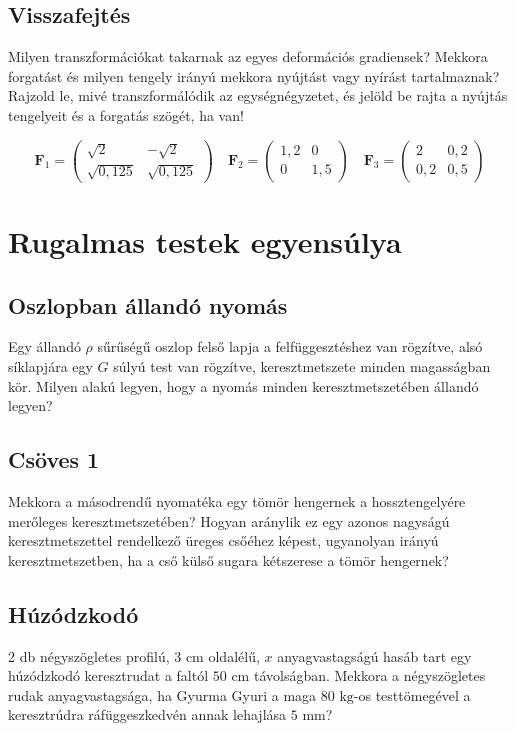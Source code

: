 \documentclass[12pt,a4paper]{scrartcl}
\let\mathbf\bm
\begin{document}
\subsection{Visszafejtés}
Milyen transzformációkat takarnak az egyes deformációs gradiensek? Mekkora forgatást és milyen tengely irányú mekkora nyújtást vagy nyírást tartalmaznak? Rajzold le, mivé transzformálódik az egységnégyzetet, és jelöld be rajta a nyújtás tengelyeit és a forgatás szögét, ha van!

\[{{\mathbf{F}}_1} = \left( {\begin{array}{*{20}{c}}
  {\sqrt 2 }&-{\sqrt 2 } \\ 
  {\sqrt {0{,}125} }&{ \sqrt {0{,}125} } 
\end{array}} \right)\quad {{\mathbf{F}}_2} = \left( {\begin{array}{*{20}{c}}
  {1{,}2}&0 \\ 
  0&{1{,}5} 
\end{array}} \right)\quad {{\mathbf{F}}_3} = \left( {\begin{array}{*{20}{c}}
  2&{0{,}2} \\ 
  {0{,}2}&{0{,}5} 
\end{array}} \right)\]


\section{Rugalmas testek egyensúlya}

\subsection{Oszlopban állandó nyomás}
Egy állandó $\rho$ sűrűségű oszlop felső lapja a felfüggesztéshez van rögzítve, alsó síklapjára egy $G$ súlyú test van rögzítve, keresztmetszete minden magasságban kör. Milyen alakú legyen, hogy a nyomás minden keresztmetszetében állandó legyen?

\subsection{Csöves 1}
Mekkora a másodrendű nyomatéka egy tömör hengernek a hossztengelyére merőleges keresztmetszetében? Hogyan aránylik ez egy azonos nagyságú keresztmetszettel rendelkező üreges csőéhez képest, ugyanolyan irányú keresztmetszetben, ha a cső külső sugara kétszerese a tömör hengernek?

\subsection{Húzódzkodó}
2 db négyszögletes profilú, $3\text{ cm}$ oldalélű, $x$ anyagvastagságú hasáb tart egy húzódzkodó keresztrudat a faltól $50\text{ cm}$ távolságban. Mekkora a négyszögletes rudak anyagvastagsága, ha Gyurma Gyuri a maga $80\text{ kg}$-os testtömegével a keresztrúdra ráfüggeszkedvén annak lehajlása $5\text{ mm}$?
\end{document}
